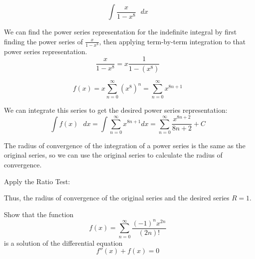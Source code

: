 \documentclass[12pt]{article}
\begin{document}
$$\int \frac{x}{1 - x^{8}} \text{ }dx$$

\begin{solution}

We can find the power series representation for the indefinite integral by first finding the power series of $\frac{x}{1 - {x^8}}$, then applying term-by-term integration to that power series representation.
$$\frac{x}{1 - x^8} = x\frac{1}{1 - (x^8)}$$

$$f(x) = x \sum_{n=0}^{\infty} (x^{8})^n = \sum_{n=0}^{\infty} x^{8n + 1}$$


We can integrate this series to get the desired power series representation:
$$ \int f(x) \text{ }dx  = \int \sum_{n=0}^{\infty} x^{8n + 1} dx =  \sum_{n=0}^{\infty} \frac{x^{8n+ 2}}{8n+2} + C$$


The radius of convergence of the integration of a power series is the same as the original series, so we can use the original series to calculate the radius of convergence.

Apply the Ratio Test:


Thus, the radius of convergence of the original series and the desired series $R = 1$.

\end{solution}
\pagebreak
Show that the function 
$$f(x) = \sum^{\infty}_{n=0} \frac{(-1)^nx^{2n}}{(2n)!}$$
is a solution of the differential equation
$$f''(x) + f(x) = 0$$
\end{document}
